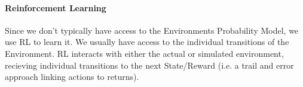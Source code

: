 \documentclass[11pt]{article}
\begin{document}
\paragraph*{Reinforcement Learning}
Since we don't typically have access to the Environments Probability Model, we use RL to learn it. We usually have access to the individual transitions of the Environment. RL interacts with either the actual or simulated environment, recieving individual transitions to the next State/Reward (i.e. a trail and error approach linking actions to returns). 
\end{document}
